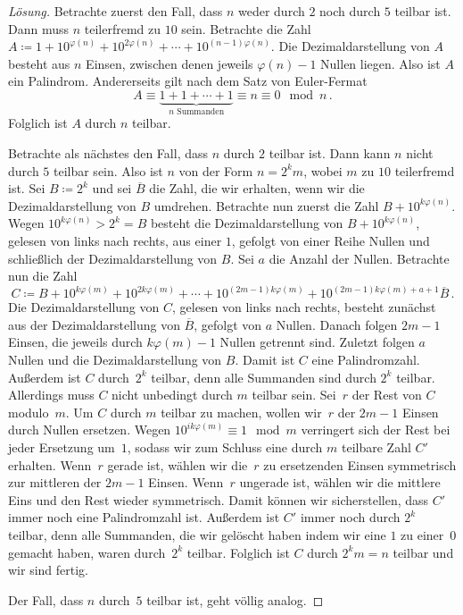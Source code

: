 \begin{proof}[Lösung]
	Betrachte zuerst den Fall, dass $n$ weder durch $2$ noch durch $5$ teilbar ist. Dann muss $n$ teilerfremd zu $10$ sein. Betrachte die Zahl $A\coloneqq 1+10^{\varphi(n)}+10^{2\varphi(n)}+\dotsb+10^{(n-1)\varphi(n)}$. Die Dezimaldarstellung von $A$ besteht aus $n$ Einsen, zwischen denen jeweils $\varphi(n)-1$ Nullen liegen. Also ist $A$ ein Palindrom. Andererseits gilt nach dem Satz von Euler-Fermat
	\begin{equation*}
		A\equiv \underbrace{1+1+\dotsb+1}_{\text{$n$ Summanden}}\equiv n\equiv 0\mod n\,.
	\end{equation*}
	Folglich ist $A$ durch $n$ teilbar.
	
	Betrachte als nächstes den Fall, dass $n$ durch $2$ teilbar ist. Dann kann $n$ nicht durch $5$ teilbar sein. Also ist $n$ von der Form $n=2^k m$, wobei $m$ zu $10$ teilerfremd ist. Sei $B\coloneqq 2^k$ und sei $\overline{B}$ die Zahl, die wir erhalten, wenn wir die Dezimaldarstellung von $B$ umdrehen. Betrachte nun zuerst die Zahl $B+10^{k\varphi(n)}$. Wegen $10^{k\varphi(n)}>2^k=B$ besteht die Dezimaldarstellung von $B+10^{k\varphi(n)}$, gelesen von links nach rechts, aus einer $1$, gefolgt von einer Reihe Nullen und schließlich der Dezimaldarstellung von $B$. Sei $a$ die Anzahl der Nullen. Betrachte nun die Zahl
	\begin{equation*}
		C\coloneqq B+10^{k\varphi(m)}+10^{2k\varphi(m)}+\dotsb+10^{(2m-1)k\varphi(m)}+10^{(2m-1)k\varphi(m)+a+1}\overline{B}\,.
	\end{equation*}
	Die Dezimaldarstellung von $C$, gelesen von links nach rechts, besteht zunächst aus der Dezimaldarstellung von $\overline{B}$, gefolgt von $a$ Nullen. Danach folgen $2m-1$ Einsen, die jeweils durch $k\varphi(m)-1$ Nullen getrennt sind. Zuletzt folgen $a$ Nullen und die Dezimaldarstellung von $B$. Damit ist $C$ eine Palindromzahl. Außerdem ist $C$ durch~$2^k$ teilbar, denn alle Summanden sind durch $2^k$ teilbar. Allerdings muss $C$ nicht unbedingt durch $m$ teilbar sein. Sei~$r$ der Rest von $C$ modulo~$m$. Um $C$ durch $m$ teilbar zu machen, wollen wir~$r$ der $2m-1$ Einsen durch Nullen ersetzen. Wegen $10^{ik\varphi(m)}\equiv 1\mod m$ verringert sich der Rest bei jeder Ersetzung um~$1$, sodass wir zum Schluss eine durch $m$ teilbare Zahl $C'$ erhalten. Wenn~$r$ gerade ist, wählen wir die~$r$ zu ersetzenden Einsen symmetrisch zur mittleren der $2m-1$ Einsen. Wenn~$r$ ungerade ist, wählen wir die mittlere Eins und den Rest wieder symmetrisch. Damit können wir sicherstellen, dass $C'$ immer noch eine Palindromzahl ist. Außerdem ist $C'$ immer noch durch $2^k$ teilbar, denn alle Summanden, die wir gelöscht haben indem wir eine $1$ zu einer~$0$ gemacht haben, waren durch~$2^k$ teilbar. Folglich ist $C$ durch $2^km=n$ teilbar und wir sind fertig.
	
	Der Fall, dass $n$ durch~$5$ teilbar ist, geht völlig analog.
\end{proof}